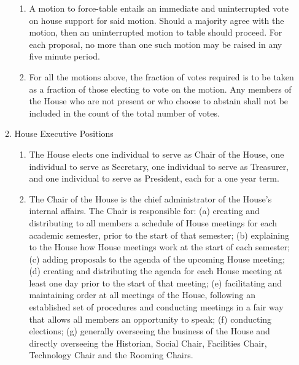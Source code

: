 \documentclass[letterpaper]{article}
\begin{document}
\begin{enumerate}
\begin{enumerate}
\begin{enumerate}
\item A motion to force-table entails an immediate and uninterrupted vote on house support for said motion. Should a majority agree with the motion, then an uninterrupted motion to table should proceed. For each proposal, no more than one such motion may be raised in any five minute period.

\item For all the motions above, the fraction of votes required is to be taken as a fraction of those electing to vote on the motion. Any members of the House who are not present or who choose to abstain shall not be included in the count of the total number of votes.

\end{enumerate}

\item House Executive Positions

\begin{enumerate}

\item The House elects one individual to serve as Chair of the House, one individual to serve as Secretary, one individual to serve as Treasurer, and one individual to serve as President, each for a one year term.

\item The Chair of the House is the chief administrator of the House's internal affairs. The Chair is responsible for: (a) creating and distributing to all members a schedule of House meetings for each academic semester, prior to the start of that semester; (b) explaining to the House how House meetings work at the start of each semester; (c) adding proposals to the agenda of the upcoming House meeting; (d) creating and distributing the agenda for each House meeting at least one day prior to the start of that meeting; (e) facilitating and maintaining order at all meetings of the House, following an established set of procedures and conducting meetings in a fair way that allows all members an opportunity to speak; (f) conducting elections; (g) generally overseeing the business of the House and directly overseeing the Historian, Social Chair, Facilities Chair, Technology Chair and the Rooming Chairs.


\end{enumerate}
\end{enumerate}
\end{enumerate}
\end{document}
